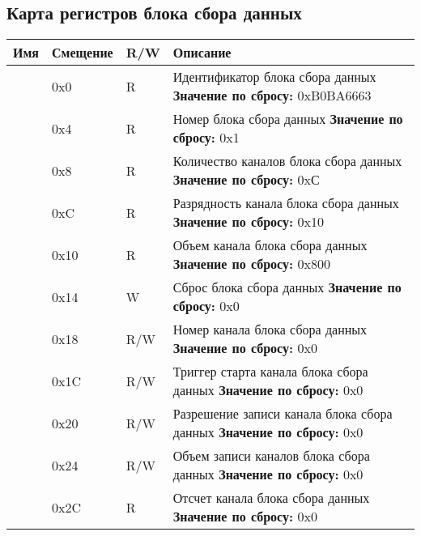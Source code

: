 \subsection{Карта регистров блока сбора данных}
\begin{longtable}{| l | l | l | p{7.5cm} |}
\hline
\textbf{Имя} & \textbf{Смещение} & \textbf{R/W} & \textbf{Описание} \\ \hline

\nameref{sec:ID} & 0x0 & R & Идентификатор блока сбора данных
\newline \textbf{Значение по сбросу:} 0xB0BA6663 \\ \hline

\nameref{sec:NUM} & 0x4 & R & Номер блока сбора данных
\newline \textbf{Значение по сбросу:} 0x1 \\ \hline

\nameref{sec:PORTS} & 0x8 & R & Количество каналов блока сбора данных
\newline \textbf{Значение по сбросу:} 0xС \\ \hline

\nameref{sec:WIDTH} & 0xC & R & Разрядность канала блока сбора данных
\newline \textbf{Значение по сбросу:} 0x10 \\ \hline

\nameref{sec:DEPTH} & 0x10 & R & Объем канала блока сбора данных
\newline \textbf{Значение по сбросу:} 0x800 \\ \hline

\nameref{sec:RESET} & 0x14 & W & Сброс блока сбора данных
\newline \textbf{Значение по сбросу:} 0x0 \\ \hline

\nameref{sec:CHAN} & 0x18 & R/W & Номер канала блока сбора данных
\newline \textbf{Значение по сбросу:} 0x0 \\ \hline

\nameref{sec:TRIG} & 0x1C & R/W & Триггер старта канала блока сбора данных
\newline \textbf{Значение по сбросу:} 0x0 \\ \hline

\nameref{sec:WREN} & 0x20 & R/W & Разрешение записи канала блока сбора данных
\newline \textbf{Значение по сбросу:} 0x0 \\ \hline

\nameref{sec:WRDEPTH} & 0x24 & R/W & Объем записи каналов блока сбора данных
\newline \textbf{Значение по сбросу:} 0x0 \\ \hline

\nameref{sec:RAM} & 0x2C & R & Отсчет канала блока сбора данных
\newline \textbf{Значение по сбросу:} 0x0 \\ \hline
\end{longtable}

